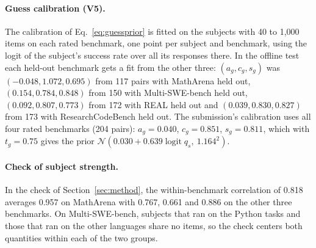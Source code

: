 \paragraph{Guess calibration (V5).}
The calibration of Eq.~\eqref{eq:guessprior} is fitted on the subjects with 40 to 1,000 items on each rated benchmark, one point per subject and benchmark, using the logit of the subject's success rate over all its responses there. In the offline test each held-out benchmark gets a fit from the other three: $(a_g, c_g, s_g)$ was $(-0.048, 1.072, 0.695)$ from 117 pairs with MathArena held out, $(0.154, 0.784, 0.848)$ from 150 with Multi-SWE-bench held out, $(0.092, 0.807, 0.773)$ from 172 with REAL held out and $(0.039, 0.830, 0.827)$ from 173 with ResearchCodeBench held out. The submission's calibration uses all four rated benchmarks (204 pairs): $a_g = 0.040$, $c_g = 0.851$, $s_g = 0.811$, which with $t_g = 0.75$ gives the prior $\mathcal{N}(0.030 + 0.639 \operatorname{logit} q_s,\ 1.164^2)$.

\paragraph{Check of subject strength.}
In the check of Section~\ref{sec:method}, the within-benchmark correlation of 0.818 averages 0.957 on MathArena with 0.767, 0.661 and 0.886 on the other three benchmarks. On Multi-SWE-bench, subjects that ran on the Python tasks and those that ran on the other languages share no items, so the check centers both quantities within each of the two groups.
